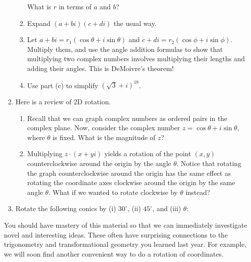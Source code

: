 \documentclass[../textbook.tex]{subfiles}
\begin{document}
\begin{enumerate}
\begin{enumerate}
What is $r$ in terms of $a$ and $b$?
\item Expand $(a+bi)(c+di)$ the usual way.
\item Let $a+bi=r_1(\cos\theta + i\sin\theta)$ and $c+di=r_2(\cos\phi + i\sin\phi)$. Multiply them, and use the angle addition formulas to show that multiplying two complex numbers involves multiplying their lengths and adding their angles. This is DeMoivre's theorem!
\item Use part (c) to simplify $(\sqrt{3}+i)^{18}$.
\end{enumerate}
\item Here is a review of 2D rotation.
\begin{enumerate}
\item Recall that we can graph complex numbers as ordered pairs in the complex plane. Now, consider the complex number $z=\cos \theta + i\sin\theta$, where $\theta$ is fixed. What is the magnitude of $z$?
\item Multiplying $z\cdot(x+yi)$ yields a rotation of the point $(x,y)$ counterclockwise around the origin by the angle $\theta$. Notice that rotating the graph counterclockwise around the origin has the same effect as rotating the coordinate axes clockwise around the origin by the same angle $\theta$. What if we wanted to rotate clockwise by $\theta$ instead?
\end{enumerate}
\item Rotate the following conics by (i) $30^\circ$, (ii) $45^\circ$, and (iii) $\theta$:
\begin{enumerate}
\end{enumerate}
\end{enumerate}

\noindent You should have mastery of this material so that we can immediately investigate novel and interesting ideas. These often have surprising connections to the trigonometry and transformational geometry you learned last year. For example, we will soon find another convenient way to do a rotation of coordinates.
\end{document}
